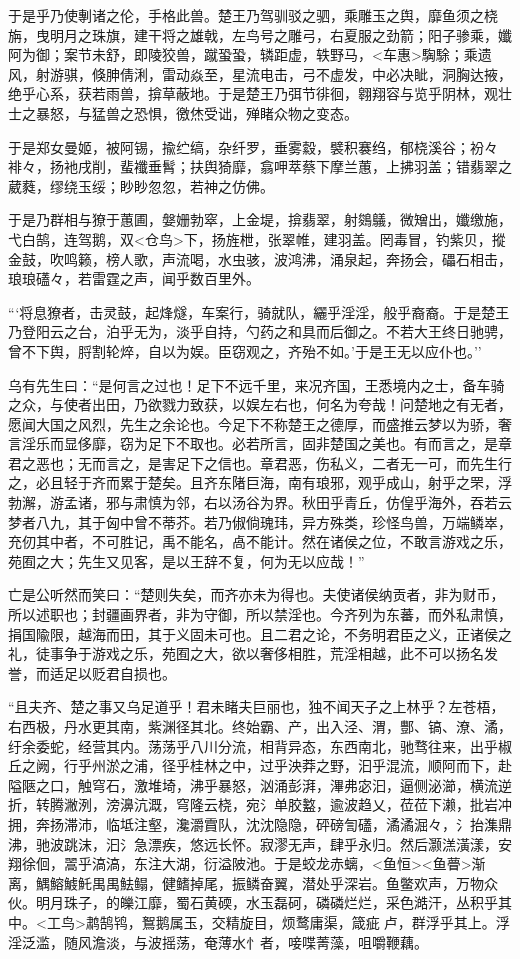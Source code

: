 \documentclass[]{article}
\begin{document}
于是乎乃使剸诸之伦，手格此兽。楚王乃驾驯驳之驷，乘雕玉之舆，靡鱼须之桡旃，曳明月之珠旗，建干将之雄戟，左鸟号之雕弓，右夏服之劲箭；阳子骖乘，孅阿为御；案节未舒，即陵狡兽，蹴蛩蛩，辚距虚，轶野马，\textless{}车惠\textgreater{}騊駼；乘遗风，射游骐，倏胂倩浰，雷动焱至，星流电击，弓不虚发，中必决眦，洞胸达掖，绝乎心系，获若雨兽，揜草蔽地。于是楚王乃弭节徘徊，翱翔容与览乎阴林，观壮士之暴怒，与猛兽之恐惧，徼烋受诎，殚睹众物之变态。

于是郑女曼姬，被阿锡，揄纻缟，杂纤罗，垂雾縠，襞积褰绉，郁桡溪谷；衯々裶々，扬衪戌削，蜚襳垂髾；扶舆猗靡，翕呷萃蔡下摩兰蕙，上拂羽盖；错翡翠之葳蕤，缪绕玉绥；眇眇忽忽，若神之仿佛。

于是乃群相与獠于蕙圃，媻姗勃窣，上金堤，揜翡翠，射鵕鸃，微矰出，孅缴施，弋白鹄，连驾鹅，双\textless{}仓鸟\textgreater{}下，扬旌枻，张翠帷，建羽盖。罔毒冒，钓紫贝，摐金鼓，吹鸣籁，榜人歌，声流喝，水虫骇，波鸿沸，涌泉起，奔扬会，礧石相击，琅琅礚々，若雷霆之声，闻乎数百里外。

```将息獠者，击灵鼓，起烽燧，车案行，骑就队，纚乎淫淫，般乎裔裔。于是楚王乃登阳云之台，泊乎无为，淡乎自持，勺药之和具而后御之。不若大王终日驰骋，曾不下舆，脟割轮焠，自以为娱。臣窃观之，齐殆不如。'于是王无以应仆也。''

乌有先生曰：``是何言之过也！足下不远千里，来况齐国，王悉境内之士，备车骑之众，与使者出田，乃欲戮力致获，以娱左右也，何名为夸哉！问楚地之有无者，愿闻大国之风烈，先生之余论也。今足下不称楚王之德厚，而盛推云梦以为骄，奢言淫乐而显侈靡，窃为足下不取也。必若所言，固非楚国之美也。有而言之，是章君之恶也；无而言之，是害足下之信也。章君恶，伤私义，二者无一可，而先生行之，必且轻于齐而累于楚矣。且齐东陼巨海，南有琅邪，观乎成山，射乎之罘，浮勃澥，游孟诸，邪与肃慎为邻，右以汤谷为界。秋田乎青丘，仿偟乎海外，吞若云梦者八九，其于匈中曾不蒂芥。若乃俶倘瑰玮，异方殊类，珍怪鸟兽，万端鳞崒，充仞其中者，不可胜记，禹不能名，卨不能计。然在诸侯之位，不敢言游戏之乐，苑囿之大；先生又见客，是以王辞不复，何为无以应哉！''

亡是公听然而笑曰：``楚则失矣，而齐亦未为得也。夫使诸侯纳贡者，非为财币，所以述职也；封疆画界者，非为守御，所以禁淫也。今齐列为东蕃，而外私肃慎，捐国隃限，越海而田，其于义固未可也。且二君之论，不务明君臣之义，正诸侯之礼，徒事争于游戏之乐，苑囿之大，欲以奢侈相胜，荒淫相越，此不可以扬名发誉，而适足以贬君自损也。

``且夫齐、楚之事又乌足道乎！君未睹夫巨丽也，独不闻天子之上林乎？左苍梧，右西极，丹水更其南，紫渊径其北。终始霸、产，出入泾、渭，酆、镐、潦、潏，纡余委蛇，经营其内。荡荡乎八川分流，相背异态，东西南北，驰骛往来，出乎椒丘之阙，行乎州淤之浦，径乎桂林之中，过乎泱莽之野，汩乎混流，顺阿而下，赴隘陿之口，触穹石，激堆埼，沸乎暴怒，汹涌彭湃，滭弗宓汩，逼侧泌瀄，横流逆折，转腾潎洌，滂濞沆溉，穹隆云桡，宛氵单胶盭，逾波趋乂，莅莅下濑，批岩冲拥，奔扬滞沛，临坻注壑，瀺灂霣队，沈沈隐隐，砰磅訇礚，潏潏淈々，氵抬潗鼎沸，驰波跳沫，汩氵急漂疾，悠远长怀。寂漻无声，肆乎永归。然后灏溔潢漾，安翔徐佪，翯乎滈滈，东注大湖，衍溢陂池。于是蛟龙赤螭，\textless{}鱼恒\textgreater{}\textless{}鱼瞢\textgreater{}渐离，鰅鰫鰬魠禺禺魼鳎，健鳍掉尾，振鳞奋翼，潜处乎深岩。鱼鳖欢声，万物众伙。明月珠子，的皪江靡，蜀石黄碝，水玉磊砢，磷磷烂烂，采色澔汗，丛积乎其中。\textless{}工鸟\textgreater{}鹔鹄鸨，鴽鹅属玉，交精旋目，烦鹜庸渠，箴疵卢，群浮乎其上。浮淫泛滥，随风澹淡，与波摇荡，奄薄水忄者，唼喋菁藻，咀嚼鞭藕。
\end{document}

